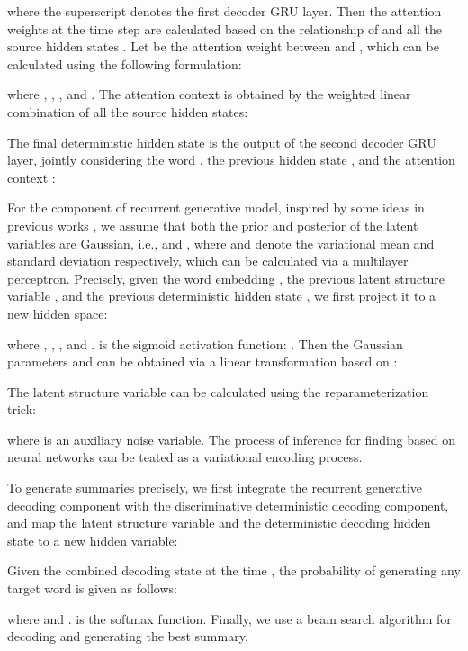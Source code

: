 \documentclass[11pt,letterpaper]{article}
\begin{document}
where the superscript  denotes the first decoder GRU layer.
Then the attention weights at the time step  are calculated based on the relationship of  and all the source hidden states . Let  be the attention weight between  and , which can be calculated using the following formulation:

where , , , and .
The attention context is obtained by the weighted linear combination of all the source hidden states:


The final deterministic hidden state  is the output of the second decoder GRU layer, jointly considering the word , the previous hidden state , and the attention context :



For the component of recurrent generative model, inspired by some ideas in previous works \cite{kingma2013auto,rezende2014stochastic,gregor2015draw}, we assume that both the prior and posterior of the latent variables are Gaussian, i.e.,   and , where   and  denote the variational mean and standard deviation respectively, which can be calculated via a multilayer perceptron. 
Precisely, given the word embedding , the previous latent structure variable , and the previous deterministic hidden state , we first project it to a new hidden space:

where , , , and .  is the sigmoid activation function: .
Then the Gaussian parameters  and  can be obtained via a linear transformation based on  :

The latent structure variable  can be calculated using the reparameterization trick:

where  is an auxiliary noise variable. The process of inference for finding  based on neural networks can be teated as a variational encoding process.

To generate summaries precisely, we first integrate the recurrent generative decoding component with the discriminative deterministic decoding component, and map the latent structure variable  and the deterministic decoding hidden state  to a new hidden variable:


Given the combined decoding state  at the time , the probability of generating any target word  is given as follows:

where  and .  is the softmax function.
Finally, we use a beam search algorithm \cite{koehn2004pharaoh} for decoding and generating the best summary.
\end{document}
